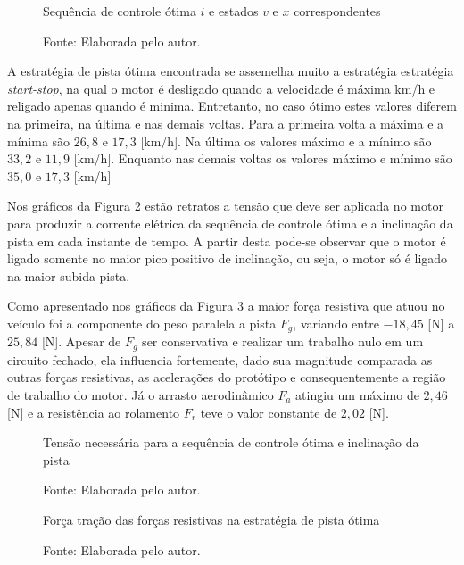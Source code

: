 \begin{figure}[H]
    \centering
    \caption{Sequência de controle ótima $i$ e estados $v$ e $x$ correspondentes}
    
    \label{graf:resultadoOCP}
    \caption*{\footnotesize{Fonte: Elaborada pelo autor.}}
\end{figure}

A estratégia de pista ótima encontrada se assemelha muito a estratégia estratégia \textit{start-stop}, na qual o motor é desligado quando a velocidade é máxima
km/h e religado apenas quando é minima. Entretanto, no caso ótimo estes valores diferem na primeira, na última e nas demais voltas. Para a primeira volta a máxima e a mínima são
$26,8$ e $17,3$ [km/h]. Na última  os valores máximo e a mínimo são $33,2$ e $11,9$ [km/h]. Enquanto nas demais voltas os valores máximo e mínimo são $35,0$ e $17,3$ [km/h]

Nos gráficos da Figura \ref{graf:resultadotensao} estão retratos a tensão que deve ser aplicada no motor para produzir a corrente elétrica da sequência de controle ótima e a inclinação da pista em cada instante de tempo.
A partir desta pode-se observar que o motor é ligado somente no maior pico positivo de inclinação, ou seja, o motor só é ligado na maior subida pista.

Como apresentado nos gráficos da Figura \ref{graf:resultadoForcas} a maior força resistiva que atuou no veículo foi a componente do peso paralela a pista $F_g$, variando entre $-18,45$ [N] a $25,84$ [N]. Apesar de $F_g$ ser conservativa
e realizar um trabalho nulo em um circuito fechado, ela influencia fortemente, dado sua magnitude comparada as outras forças resistivas, as acelerações do protótipo e consequentemente a região de trabalho do motor.
Já o arrasto aerodinâmico $F_a$ atingiu um máximo de $2,46$ [N] e a resistência ao rolamento $F_r$ teve o valor constante de $2,02$ [N].  

\begin{figure}[h]
    \centering
    \caption{Tensão necessária para a sequência de controle ótima e inclinação da pista}
    
    \label{graf:resultadotensao}
    \caption*{\footnotesize{Fonte: Elaborada pelo autor.}}
\end{figure}

\begin{figure}[h]
    \centering
    \caption{Força tração das forças resistivas na estratégia de pista ótima}
    
    \label{graf:resultadoForcas}
    \caption*{\footnotesize{Fonte: Elaborada pelo autor.}}
\end{figure}







\clearpage